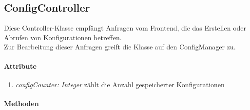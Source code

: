 \subsection{ConfigController}
Diese Controller-Klasse empfängt Anfragen vom Frontend, die das Erstellen oder Abrufen von Konfigurationen betreffen. \\Zur Bearbeitung dieser Anfragen greift die Klasse auf den ConfigManager zu.


\paragraph{Attribute}
\begin{enumerate}[$\bullet$]
	\item \textit{configCounter: Integer} zählt die Anzahl gespeicherter Konfigurationen
\end{enumerate}

\paragraph{Methoden}

